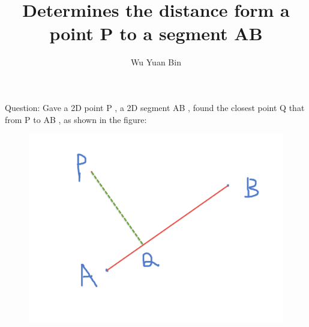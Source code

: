 \documentclass[12pt]{article}
\title{Determines the distance form a point P to a segment AB}
\author{Wu Yuan Bin}
\begin{document}
	
	
	
\maketitle
Question:
Gave a 2D point P , a 2D segment AB , found the closest point Q that from P to AB ,  as shown in the figure:
\begin{figure}[t]
	\centering
	\includegraphics[width=0.5\linewidth]{pic0}
	\caption{}
	\label{fig:1}
\end{figure}\\
\end{document}
